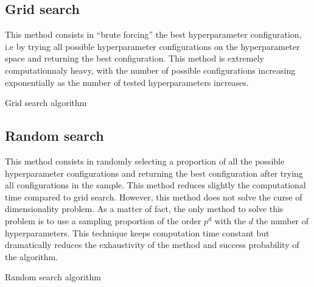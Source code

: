 \documentclass[a4 paper,11pt,2]{article}
\begin{document}
\subsection{Grid search}
This method consists in ``brute forcing'' the best hyperparameter configuration, i.e by trying all possible hyperparameter configurations on the hyperparameter space and returning the best configuration. This method is extremely computationnaly heavy, with the number of possible configurations increasing exponentially as the number of tested hyperparameters increases.
\begin{algorithm}
    \SetAlgoLined
    \caption{Grid search algorithm}
\end{algorithm}

\subsection{Random search}
This method consists in randomly selecting a proportion of all the possible hyperparameter configurations and returning the best configuration after trying all configurations in the sample. This method reduces slightly the computational time compared to grid search. However, this method does not solve the curse of dimensionality problem. As a matter of fact, the only method to solve this problem is to use a sampling proportion of the order $p^d$ with the $d$ the number of hyperparameters. This technique keeps computation time constant but dramatically reduces the exhaustivity of the method and success probability of the algorithm.
\begin{algorithm}
    \SetAlgoLined
    \caption{Random search algorithm}
\end{algorithm}
\end{document}
